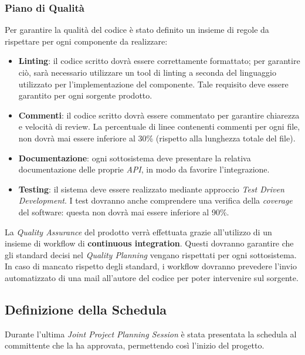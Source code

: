\subsubsection{Piano di Qualità}

Per garantire la qualità del codice è stato definito un insieme di regole da rispettare per ogni componente da realizzare:
\begin{itemize}
    \item \textbf{Linting}: il codice scritto dovrà essere correttamente formattato; per garantire ciò, sarà necessario utilizzare un tool di linting a seconda del linguaggio utilizzato per l'implementazione del componente. Tale requisito deve essere garantito per ogni sorgente prodotto.
    \item \textbf{Commenti}: il codice scritto dovrà essere commentato per garantire chiarezza e velocità di review. La percentuale di linee contenenti commenti per ogni file, non dovrà mai essere inferiore al 30\% (rispetto alla lunghezza totale del file).
    \item \textbf{Documentazione}: ogni sottosistema deve presentare la relativa documentazione delle proprie \textit{API}, in modo da favorire l'integrazione.
    \item \textbf{Testing}: il sistema deve essere realizzato mediante approccio \textit{Test Driven Development}. I test dovranno anche comprendere una verifica della \textit{coverage} del software: questa non dovrà mai essere inferiore al 90\%.
\end{itemize}

La \textit{Quality Assurance} del prodotto verrà effettuata grazie all'utilizzo di un insieme di workflow di \textbf{continuous integration}. Questi dovranno garantire che gli standard decisi nel \textit{Quality Planning} vengano rispettati per ogni sottosistema. In caso di mancato rispetto degli standard, i workflow dovranno prevedere l'invio automatizzato di una mail all'autore del codice per poter intervenire sul sorgente.

\subsection{Definizione della Schedula}

Durante l'ultima \textit{Joint Project Planning Session} è stata presentata la schedula al committente che la ha approvata, permettendo così l'inizio del progetto.

